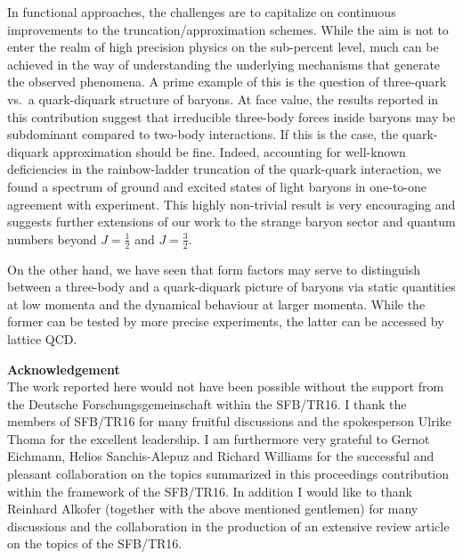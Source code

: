 \documentclass[epj,twocolumn]{webofc}
\begin{document}
In functional approaches, the challenges are to capitalize on continuous improvements
to the truncation/approximation schemes. While the aim is not to enter the realm
of high precision physics on the sub-percent level, much can be achieved in the way
of understanding the underlying mechanisms that generate the observed phenomena.
A prime example of this is the question of three-quark vs.\ a quark-diquark structure of
baryons. At face value, the results reported in this contribution
suggest that irreducible three-body forces inside baryons may be subdominant
compared to two-body interactions. If this is the case, the quark-diquark approximation
should be fine. Indeed, accounting for well-known deficiencies in the rainbow-ladder
truncation of the quark-quark interaction, we found a spectrum of ground and excited
states of light baryons in one-to-one agreement with experiment. This highly non-trivial
result is very encouraging and suggests further extensions of our work to the strange
baryon sector and quantum numbers beyond $J=\tfrac{1}{2}$ and $J=\tfrac{3}{2}$.

On the other hand, we have seen that form factors may serve to distinguish between a
three-body and a quark-diquark picture of baryons via static quantities at low momenta
and the dynamical behaviour at larger momenta. While the former can be tested by more
precise experiments, the latter can be accessed by lattice QCD. 
\vspace*{2mm}


\begin{acknowledgement}
{\bf Acknowledgement}\\
The work reported here would not have been possible without the
support from the Deutsche Forschungsgemeinschaft within the SFB/TR16.
I thank the members of SFB/TR16 for many fruitful discussions and the
spokesperson Ulrike Thoma for the excellent leadership.
I am furthermore very grateful to Gernot Eichmann, Helios Sanchis-Alepuz 
and Richard Williams for the successful and pleasant collaboration on the
topics summarized in this proceedings contribution within the framework 
of the SFB/TR16. In addition I would like to thank Reinhard Alkofer (together 
with the above mentioned gentlemen) for many discussions and the collaboration 
in the production of an extensive review article \cite{Eichmann:2016yit} 
on the topics of the SFB/TR16.
\end{acknowledgement}




\end{document}
